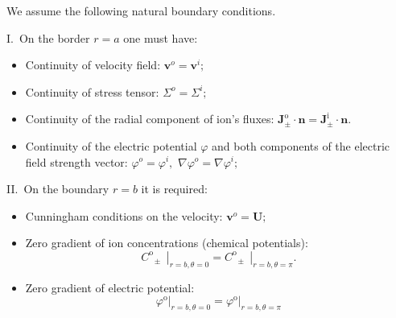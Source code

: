 \documentclass{amsart}
\begin{document}
We assume the following natural boundary conditions.

I.\  On the border  $r=a$ one must have:
\begin{itemize}
\item	Continuity of velocity field:   ${\mathbf {v}}^o={\mathbf {v}}^i;$
\item	Continuity of stress tensor: $\Sigma^o=\Sigma^i;$
\item	Continuity of the radial component of ion's fluxes:
$\mathbf{{J}}_{\pm }^{\text{o}}\cdot \mathbf{n}=\mathbf{J}_{\pm }^{\text{i}}\cdot \mathbf{n}.$
\item	Continuity of the electric potential $\varphi $ and both components of the electric field strength vector: $\varphi^o=\varphi^i,$ $\nabla \varphi^o=\nabla\varphi^i;$
\end{itemize}
II.\ On the boundary  $r=b$ it is required:\\
\begin{itemize}
\item	Cunningham conditions on the velocity:
${\mathbf {v}}^o={\mathbf {U}};$
\item	Zero  gradient of ion concentrations (chemical potentials):
$${{\left. C_{\text{ }\!\!\pm\!\!\text{ }}^{\text{o}} \right|}_{r=b,\theta =0}}={{\left. C_{\text{ }\!\!\pm\!\!\text{ }}^{\text{o}} \right|}_{r=b,\theta =\pi }}.$$
\item	Zero  gradient of electric potential:
$${{\left. {{\varphi }^{\text{o}}} \right|}_{r=b,\theta =0}}={{\left. {{\varphi }^{\text{o}}} \right|}_{r=b,\theta =\pi }}$$
\end{itemize}
\end{document}
